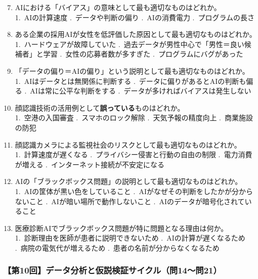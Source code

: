 \documentclass[b4paper,7pt,twocolumn,landscape]{jsarticle}
\begin{document}
\begin{enumerate}
\setcounter{enumi}{6}
\item AIにおける「バイアス」の意味として最も適切なものはどれか。\\
1.~AIの計算速度 .~データや判断の偏り .~AIの消費電力 .~プログラムの長さ

\item ある企業の採用AIが女性を低評価した原因として最も適切なものはどれか。\\
1.~ハードウェアが故障していた .~過去データが男性中心で「男性＝良い候補者」と学習 .~女性の応募者数が多すぎた .~プログラムにバグがあった

\item 「データの偏り＝AIの偏り」という説明として最も適切なものはどれか。\\
1.~AIはデータとは無関係に判断する .~データに偏りがあるとAIの判断も偏る .~AIは常に公平な判断をする .~データが多ければバイアスは発生しない

\item 顔認識技術の活用例として\textbf{誤っている}ものはどれか。\\
1.~空港の入国審査 .~スマホのロック解除 .~天気予報の精度向上 .~商業施設の防犯

\item 顔認識カメラによる監視社会のリスクとして最も適切なものはどれか。\\
1.~計算速度が遅くなる .~プライバシー侵害と行動の自由の制限 .~電力消費が増える .~インターネット接続が不安定になる

\item AIの「ブラックボックス問題」の説明として最も適切なものはどれか。\\
1.~AIの筐体が黒い色をしていること .~AIがなぜその判断をしたかが分からないこと .~AIが暗い場所で動作しないこと .~AIのデータが暗号化されていること

\item 医療診断AIでブラックボックス問題が特に問題となる理由は何か。\\
1.~診断理由を医師が患者に説明できないため .~AIの計算が遅くなるため .~病院の電気代が増えるため .~患者の名前が分からなくなるため
\end{enumerate}

\subsubsection*{【第10回】データ分析と仮説検証サイクル（問14〜問21）}
\end{document}
